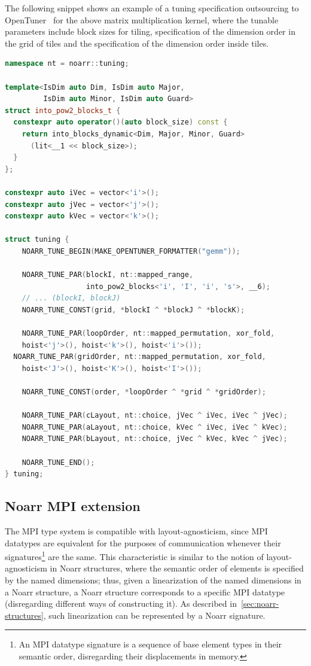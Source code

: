 The following snippet shows an example of a tuning specification outsourcing to OpenTuner~\cite{ansel2014opentuner} for the above matrix multiplication kernel, where the tunable parameters include block sizes for tiling, specification of the dimension order in the grid of tiles and the specification of the dimension order inside tiles.

\begin{lstlisting}[language=C++, caption={An example of a tuning specification}]
namespace nt = noarr::tuning;

template<IsDim auto Dim, IsDim auto Major,
         IsDim auto Minor, IsDim auto Guard>
struct into_pow2_blocks_t {
  constexpr auto operator()(auto block_size) const {
    return into_blocks_dynamic<Dim, Major, Minor, Guard>
      (lit<__1 << block_size>);
  }
};

constexpr auto iVec = vector<'i'>();
constexpr auto jVec = vector<'j'>();
constexpr auto kVec = vector<'k'>();

struct tuning {
	NOARR_TUNE_BEGIN(MAKE_OPENTUNER_FORMATTER("gemm"));

	NOARR_TUNE_PAR(blockI, nt::mapped_range,
                   into_pow2_blocks<'i', 'I', 'i', 's'>, __6);
	// ... (blockI, blockJ)
	NOARR_TUNE_CONST(grid, *blockI ^ *blockJ ^ *blockK);

	NOARR_TUNE_PAR(loopOrder, nt::mapped_permutation, xor_fold,
    hoist<'j'>(), hoist<'k'>(), hoist<'i'>());
  NOARR_TUNE_PAR(gridOrder, nt::mapped_permutation, xor_fold,
    hoist<'J'>(), hoist<'K'>(), hoist<'I'>());

	NOARR_TUNE_CONST(order, *loopOrder ^ *grid ^ *gridOrder);

	NOARR_TUNE_PAR(cLayout, nt::choice, jVec ^ iVec, iVec ^ jVec);
	NOARR_TUNE_PAR(aLayout, nt::choice, kVec ^ iVec, iVec ^ kVec);
	NOARR_TUNE_PAR(bLayout, nt::choice, jVec ^ kVec, kVec ^ jVec);

	NOARR_TUNE_END();
} tuning;
\end{lstlisting}


\subsection{Noarr MPI extension}\label{sec:noarr-mpi}

The MPI type system is compatible with layout-agnosticism, since MPI datatypes are equivalent for the purposes of communication whenever their signatures\footnote{An MPI datatype signature is a sequence of base element types in their semantic order, disregarding their displacements in memory.} are the same. This characteristic is similar to the notion of layout-agnosticism in Noarr structures, where the semantic order of elements is specified by the named dimensions; thus, given a linearization of the named dimensions in a Noarr structure, a Noarr structure corresponds to a specific MPI datatype (disregarding different ways of constructing it). As described in~\cref{sec:noarr-structures}, such linearization can be represented by a Noarr signature. %

